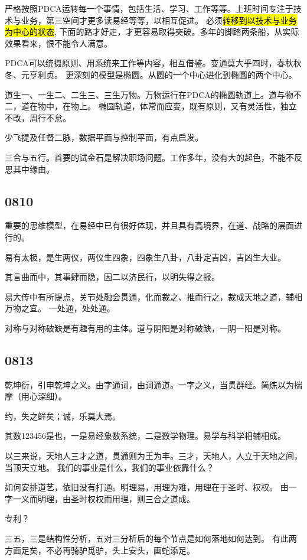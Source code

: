 严格按照PDCA运转每一个事情，包括生活、学习、工作等等。上班时间专注于技术与业务，第三空间才更多读易经等等，以相互促进。
必须\hl{转移到以技术与业务为中心的状态}, 下面的路才好走，才更容易取得突破。多年的脚踏两条船，从实际效果看来，恨不能令人满意。

PDCA可以统摄原则、用系统来工作等内容，相互借鉴。变通莫大乎四时，春秋秋冬、元亨利贞。
更深刻的模型是椭圆。从圆的一个中心进化到椭圆的两个中心。

道生一、一生二、二生三、三生万物。万物运行在PDCA的椭圆轨道上。道与物不二，道在物中，在物上。
椭圆轨道，体常而应变，既有原则，又有灵活性，独立不改，周行不怠。

少飞提及任督二脉，数据平面与控制平面，有点启发。

三合与五行。首要的试金石是解决职场问题。工作多年，没有大的起色，不能不反思其中缘由。

\subsection{0810}

重要的思维模型，在易经中已有很好体现，并且具有高境界，在道、战略的层面进行的。

易有太极，是生两仪，两仪生四象，四象生八卦，八卦定吉凶，吉凶生大业。

其言曲而中，其事肆而隐，因二以济民行，以明失得之报。

易大传中有所提点，关节处融会贯通，化而裁之、推而行之，裁成天地之道，辅相万物之宜。
一处通，处处通。

对称与对称破缺是有趣有用的主体。道与阴阳是对称破缺，一阴一阳是对称。

\subsection{0813}

乾坤衍，引申乾坤之义。由字通词，由词通道。一字之义，当贯群经。简练以为揣摩（用心深细）。

约，失之鲜矣；诚，乐莫大焉。

其数123456是也，一是易经象数系统，二是数学物理。易学与科学相辅相成。

以三来说，天地人三才之道，贯通则为王为丰。三才，天地人，人立于天地之间，当顶天立地。
我们的事业是什么，我们的事业依靠什么？

如何安排道艺，依旧没有打通。明理易，用理为难，用理在于圣时、权权。
由一字一义而明理，由圣时权权而用理，则三合之道成。

专利？

三五，三是结构性分析，五对三分析后的每个节点是如何落地如何达到。
有此两方面足矣，不必再骑驴觅驴，头上安头，画蛇添足。

